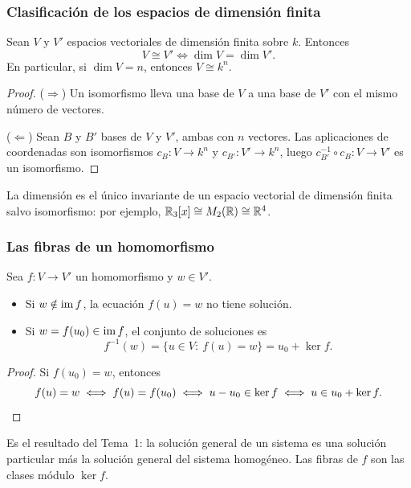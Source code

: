 \begin{frame}
    \frametitle{Clasificación de los espacios de dimensión finita}

    \begin{theorem}
        Sean $V$ y $V'$ espacios vectoriales de dimensión finita sobre
        $k$. Entonces
        \[
            V\cong V'\iff\dim V=\dim V'.
        \]
        En particular, si $\dim V=n$, entonces $V\cong k^n$.
    \end{theorem}

    \begin{proof}
        ($\Rightarrow$) Un isomorfismo lleva una base de $V$ a una base de
        $V'$ con el mismo número de vectores.

        ($\Leftarrow$) Sean $B$ y $B'$ bases de $V$ y $V'$, ambas con
        $n$ vectores. Las aplicaciones de coordenadas son isomorfismos
        $c_B\colon V\to k^n$ y $c_{B'}\colon V'\to k^n$, luego
        $c_{B'}^{-1}\circ c_B\colon V\to V'$ es un isomorfismo.
    \end{proof}

    \medskip

    La dimensión es el \alert{único} invariante de un espacio vectorial de
    dimensión finita salvo isomorfismo: por ejemplo,
    $\mathbb{R}_3[x]\cong M_2(\mathbb{R})\cong\mathbb{R}^4$.
\end{frame}


\begin{frame}
    \frametitle{Las fibras de un homomorfismo}

    \begin{proposition}
        Sea $f\colon V\to V'$ un homomorfismo y $w\in V'$.
        \begin{itemize}
            \item Si $w\notin\operatorname{im} f$, la ecuación $f(u)=w$ no tiene solución.
            \item Si $w=f(u_0)\in\operatorname{im} f$, el conjunto de soluciones es
            \[
                f^{-1}(w)=\{u\in V:\ f(u)=w\}=u_0+\ker f.
            \]
        \end{itemize}
    \end{proposition}

    \begin{proof}
        Si $f(u_0)=w$, entonces
        \[
            f(u)=w\iff f(u)=f(u_0)\iff u-u_0\in\ker f
            \iff u\in u_0+\ker f.\qedhere
        \]
    \end{proof}

    \medskip

    Es el resultado del Tema~1: \alert{la solución general de un sistema
    es una solución particular más la solución general del sistema
    homogéneo}. Las fibras de $f$ son las clases módulo $\ker f$.
\end{frame}


